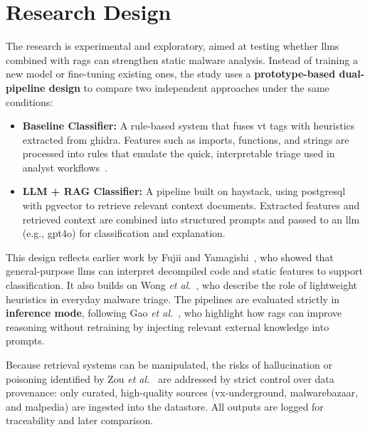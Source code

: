 \section{Research Design}\label{sec:ResearchDesign}
The research is experimental and exploratory, aimed at testing whether \glspl{llm} combined with
\glspl{rag} can strengthen static \gls{malware} analysis. Instead of training a new model or
fine-tuning existing ones, the study uses a \textbf{prototype-based dual-pipeline design} to
compare two independent approaches under the same conditions:
\begin{itemize}
      \item \textbf{Baseline Classifier:} A rule-based system that fuses
            \gls{vt} tags with heuristics extracted from \gls{ghidra}. Features such
            as imports, functions, and strings are processed into rules that emulate
            the quick, interpretable triage used in analyst
            workflows~\cite{wong2021practice}.
      \item \textbf{LLM + RAG Classifier:} A pipeline built on \gls{haystack},
            using \gls{postgresql} with \gls{pgvector} to retrieve relevant context
            documents. Extracted features and retrieved context are combined into
            structured prompts and passed to an \gls{llm} (e.g., \gls{gpt4o})
            for classification and explanation.
\end{itemize}

This design reflects earlier work by Fujii and Yamagishi~\cite{fujii2024llm}, who showed that
general-purpose \glspl{llm} can interpret decompiled code and static features to support
classification. It also builds on Wong \emph{et al.}~\cite{wong2021practice}, who describe the role
of lightweight heuristics in everyday malware triage. The pipelines are evaluated strictly in
\textbf{inference mode}, following Gao \emph{et al.}~\cite{gao2023retrieval}, who highlight how
\glspl{rag} can improve reasoning without retraining by injecting relevant external knowledge into
prompts.

Because retrieval systems can be manipulated, the risks of hallucination or poisoning identified by
Zou \emph{et al.}~\cite{zou2024poisonedrag} are addressed by strict control over data provenance:
only curated, high-quality sources (\gls{vx-underground}, \gls{malwarebazaar}, and \gls{malpedia})
are ingested into the datastore. All outputs are logged for traceability and later comparison.

